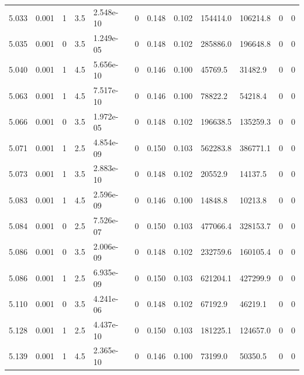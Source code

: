 \documentclass[preview]{standalone}
\begin{document}
{{{{{{{{{{{\begin{tabular}{L{1.2cm}C{1.2cm} C{0.3cm}C{0.5cm} C{1.4cm}C{1.4cm} C{1.4cm}C{1.4cm} C{1.6cm}C{1.6cm} C{1.6cm}C{1.6cm}}
  5.033  &  0.001  & 1     & 3.5 &  2.548e-10  & 0  &  0.148&   0.102& 154414.0 & 106214.8   &  0 & 0  \\ 
  5.035  &  0.001  & 0     & 3.5 &  1.249e-05  & 0  &  0.148&   0.102& 285886.0 & 196648.8   &  0 & 0  \\ 
  5.040  &  0.001  & 1     & 4.5 &  5.656e-10  & 0  &  0.146&   0.100& 45769.5 & 31482.9   &  0 & 0  \\ 
  5.063  &  0.001  & 1     & 4.5 &  7.517e-10  & 0  &  0.146&   0.100& 78822.2 & 54218.4   &  0 & 0  \\ 
  5.066  &  0.001  & 0     & 3.5 &  1.972e-05  & 0  &  0.148&   0.102& 196638.5 & 135259.3   &  0 & 0  \\ 
  5.071  &  0.001  & 1     & 2.5 &  4.854e-09  & 0  &  0.150&   0.103& 562283.8 & 386771.1   &  0 & 0  \\ 
  5.073  &  0.001  & 1     & 3.5 &  2.883e-10  & 0  &  0.148&   0.102& 20552.9 & 14137.5   &  0 & 0  \\ 
  5.083  &  0.001  & 1     & 4.5 &  2.596e-09  & 0  &  0.146&   0.100& 14848.8 & 10213.8   &  0 & 0  \\ 
  5.084  &  0.001  & 0     & 2.5 &  7.526e-07  & 0  &  0.150&   0.103& 477066.4 & 328153.7   &  0 & 0  \\ 
  5.086  &  0.001  & 0     & 3.5 &  2.006e-09  & 0  &  0.148&   0.102& 232759.6 & 160105.4   &  0 & 0  \\ 
  5.086  &  0.001  & 1     & 2.5 &  6.935e-09  & 0  &  0.150&   0.103& 621204.1 & 427299.9   &  0 & 0  \\ 
  5.110  &  0.001  & 0     & 3.5 &  4.241e-06  & 0  &  0.148&   0.102& 67192.9 & 46219.1   &  0 & 0  \\ 
  5.128  &  0.001  & 1     & 2.5 &  4.437e-10  & 0  &  0.150&   0.103& 181225.1 & 124657.0   &  0 & 0  \\ 
  5.139  &  0.001  & 1     & 4.5 &  2.365e-10  & 0  &  0.146&   0.100& 73199.0 & 50350.5   &  0 & 0  \\ 
\hline 
\end{tabular} 

}}}}}}}}}}}
\end{document}
